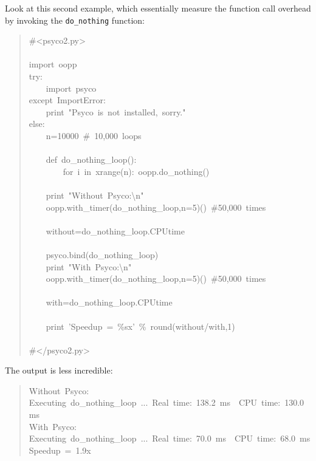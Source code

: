 \documentclass[10pt,english]{article}
\begin{document}
Look at this second example, which essentially measure the function 
call overhead by invoking the \texttt{do{\_}nothing} function:
\begin{quote}
\begin{ttfamily}\begin{flushleft}
\mbox{{\#}<psyco2.py>}\\
\mbox{}\\
\mbox{import~oopp}\\
\mbox{try:~}\\
\mbox{~~~~import~psyco}\\
\mbox{except~ImportError:}\\
\mbox{~~~~print~"Psyco~is~not~installed,~sorry."}\\
\mbox{else:}\\
\mbox{~~~~n=10000~{\#}~10,000~loops}\\
\mbox{~}\\
\mbox{~~~~def~do{\_}nothing{\_}loop():}\\
\mbox{~~~~~~~~for~i~in~xrange(n):~oopp.do{\_}nothing()}\\
\mbox{}\\
\mbox{~~~~print~"Without~Psyco:{\textbackslash}n"}\\
\mbox{~~~~oopp.with{\_}timer(do{\_}nothing{\_}loop,n=5)()~{\#}50,000~times}\\
\mbox{}\\
\mbox{~~~~without=do{\_}nothing{\_}loop.CPUtime}\\
\mbox{}\\
\mbox{~~~~psyco.bind(do{\_}nothing{\_}loop)~}\\
\mbox{~~~~print~"With~Psyco:{\textbackslash}n"}\\
\mbox{~~~~oopp.with{\_}timer(do{\_}nothing{\_}loop,n=5)()~{\#}50,000~times}\\
\mbox{}\\
\mbox{~~~~with=do{\_}nothing{\_}loop.CPUtime}\\
\mbox{}\\
\mbox{~~~~print~'Speedup~=~{\%}sx'~{\%}~round(without/with,1)}\\
\mbox{}\\
\mbox{{\#}</psyco2.py>}
\end{flushleft}\end{ttfamily}
\end{quote}

The output is less incredible:
\begin{quote}
\begin{ttfamily}\begin{flushleft}
\mbox{Without~Psyco:}\\
\mbox{Executing~do{\_}nothing{\_}loop~...~Real~time:~138.2~ms~~CPU~time:~130.0~ms}\\
\mbox{With~Psyco:}\\
\mbox{Executing~do{\_}nothing{\_}loop~...~Real~time:~70.0~ms~~CPU~time:~68.0~ms}\\
\mbox{Speedup~=~1.9x}
\end{flushleft}\end{ttfamily}
\end{quote}
\end{document}
